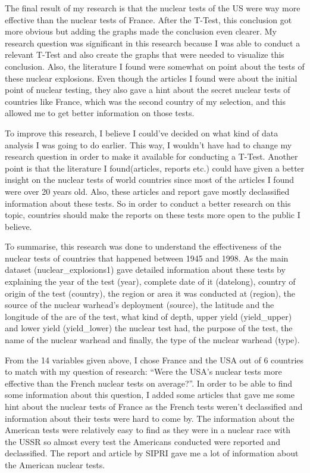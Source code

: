 \documentclass[
  12pt,
]{article}
\begin{document}
The final result of my research is that the nuclear tests of the US were way more effective than the nuclear tests of France. After the T-Test, this conclusion got more obvious but adding the graphs made the conclusion even clearer. My research question was significant in this research because I was able to conduct a relevant T-Test and also create the graphs that were needed to visualize this conclusion. Also, the literature I found were somewhat on point about the tests of these nuclear explosions. Even though the articles I found were about the initial point of nuclear testing, they also gave a hint about the secret nuclear tests of countries like France, which was the second country of my selection, and this allowed me to get better information on those tests.

To improve this research, I believe I could've decided on what kind of data analysis I was going to do earlier. This way, I wouldn't have had to change my research question in order to make it available for conducting a T-Test. Another point is that the literature I found(articles, reports etc.) could have given a better insight on the nuclear tests of world countries since most of the articles I found were over 20 years old. Also, these articles and report gave mostly declassified information about these tests. So in order to conduct a better research on this topic, countries should make the reports on these tests more open to the public I believe.

To summarise, this research was done to understand the effectiveness of the nuclear tests of countries that happened between 1945 and 1998. As the main dataset (nuclear\_explosions1) gave detailed information about these tests by explaining the year of the test (year), complete date of it (datelong), country of origin of the test (country), the region or area it was conducted at (region), the source of the nuclear warhead's deployment (source), the latitude and the longitude of the are of the test, what kind of depth, upper yield (yield\_upper) and lower yield (yield\_lower) the nuclear test had, the purpose of the test, the name of the nuclear warhead and finally, the type of the nuclear warhead (type).

From the 14 variables given above, I chose France and the USA out of 6 countries to match with my question of research: ``Were the USA's nuclear tests more effective than the French nuclear tests on average?''. In order to be able to find some information about this question, I added some articles that gave me some hint about the nuclear tests of France as the French tests weren't declassified and information about their tests were hard to come by. The information about the American tests were relatively easy to find as they were in a nuclear race with the USSR so almost every test the Americans conducted were reported and declassified. The report and article by SIPRI gave me a lot of information about the American nuclear tests.
\end{document}
